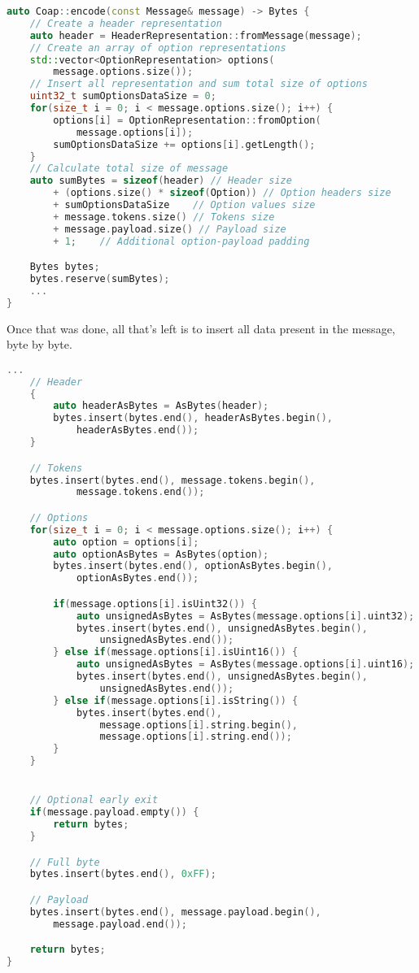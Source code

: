 \documentclass[a4paper, titlepage,12pt]{article}
\begin{document}
		\begin{lstlisting}[language=C++]
auto Coap::encode(const Message& message) -> Bytes {
	// Create a header representation
	auto header = HeaderRepresentation::fromMessage(message);
	// Create an array of option representations
	std::vector<OptionRepresentation> options(
		message.options.size());
	// Insert all representation and sum total size of options
	uint32_t sumOptionsDataSize = 0;
	for(size_t i = 0; i < message.options.size(); i++) {
		options[i] = OptionRepresentation::fromOption(
			message.options[i]);
		sumOptionsDataSize += options[i].getLength();
	}
	// Calculate total size of message
	auto sumBytes = sizeof(header) // Header size
		+ (options.size() * sizeof(Option)) // Option headers size
		+ sumOptionsDataSize 	// Option values size
		+ message.tokens.size() // Tokens size
		+ message.payload.size() // Payload size
		+ 1;	// Additional option-payload padding

	Bytes bytes;
	bytes.reserve(sumBytes);
	...
}
		\end{lstlisting}

		Once that was done, all that's left is to insert all data present in the message, byte by byte.

		\begin{lstlisting}[language=C++]
	...
	// Header
	{
		auto headerAsBytes = AsBytes(header);
		bytes.insert(bytes.end(), headerAsBytes.begin(), 
			headerAsBytes.end());
	}

	// Tokens
	bytes.insert(bytes.end(), message.tokens.begin(), 
			message.tokens.end());

	// Options
	for(size_t i = 0; i < message.options.size(); i++) {
		auto option = options[i];
		auto optionAsBytes = AsBytes(option);
		bytes.insert(bytes.end(), optionAsBytes.begin(), 
			optionAsBytes.end());

		if(message.options[i].isUint32()) {
			auto unsignedAsBytes = AsBytes(message.options[i].uint32);
			bytes.insert(bytes.end(), unsignedAsBytes.begin(), 
				unsignedAsBytes.end());
		} else if(message.options[i].isUint16()) {
			auto unsignedAsBytes = AsBytes(message.options[i].uint16);
			bytes.insert(bytes.end(), unsignedAsBytes.begin(), 
				unsignedAsBytes.end());
		} else if(message.options[i].isString()) {
			bytes.insert(bytes.end(), 
				message.options[i].string.begin(),
				message.options[i].string.end());
		}
	}


	// Optional early exit
	if(message.payload.empty()) {
		return bytes;
	}

	// Full byte
	bytes.insert(bytes.end(), 0xFF);

	// Payload
	bytes.insert(bytes.end(), message.payload.begin(), 
		message.payload.end());

	return bytes;
}
\end{lstlisting}
\end{document}
